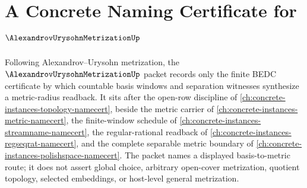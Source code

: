 \chapter{A Concrete Naming Certificate for $\AlexandrovUrysohnMetrizationUp$}
\label{ch:concrete-instances-alexandrov-urysohn-metrization-namecert}

Following Alexandrov--Urysohn metrization, the $\AlexandrovUrysohnMetrizationUp$ packet records only the finite BEDC certificate by which countable basis windows and separation witnesses synthesize a metric-radius readback. It sits after the open-row discipline of \autoref{ch:concrete-instances-topology-namecert}, beside the metric carrier of \autoref{ch:concrete-instances-metric-namecert}, the finite-window schedule of \autoref{ch:concrete-instances-streamname-namecert}, the regular-rational readback of \autoref{ch:concrete-instances-regseqrat-namecert}, and the complete separable metric boundary of \autoref{ch:concrete-instances-polishspace-namecert}. The packet names a displayed basis-to-metric route; it does not assert global choice, arbitrary open-cover metrization, quotient topology, selected embeddings, or host-level general metrization.

